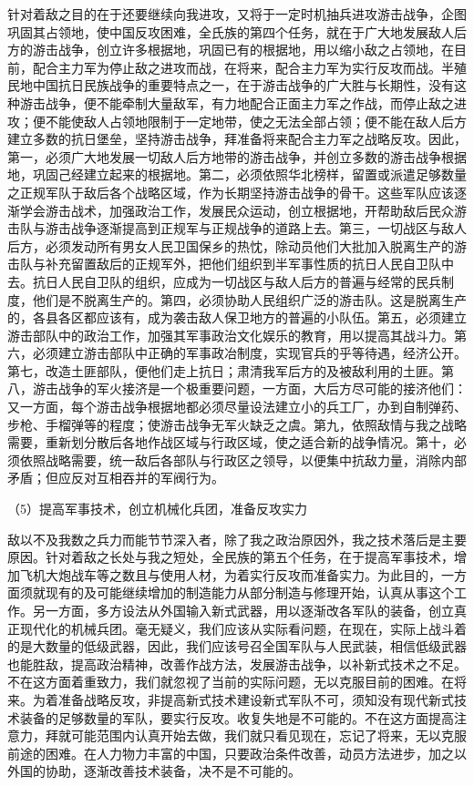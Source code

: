 \documentclass[UTF8, 12pt, a4paper]{ctexrep}
\begin{document}
针对着敌之目的在于还要继续向我进攻，又将于一定时机抽兵进攻游击战争，企图巩固其占领地，使中国反攻困难，全氏族的第四个任务，就在于广大地发展敌人后方的游击战争，创立许多根据地，巩固已有的根据地，用以缩小敌之占领地，在目前，配合主力军为停止敌之进攻而战，在将来，配合主力军为实行反攻而战。半殖民地中国抗日民族战争的重要特点之一，在于游击战争的广大胜与长期性，没有这种游击战争，便不能牵制大量敌军，有力地配合正面主力军之作战，而停止敌之进攻；便不能使敌人占领地限制于一定地带，使之无法全部占领；便不能在敌人后方建立多数的抗日堡垒，坚持游击战争，拜准备将来配合主力军之战略反攻。因此，第一，必须广大地发展一切敌人后方地带的游击战争，并创立多数的游击战争根据地，巩固己经建立起来的根据地。第二，必须依照华北榜样，留置或派遣足够数量之正规军队于敌后各个战略区域，作为长期坚持游击战争的骨干。这些军队应该逐渐学会游击战术，加强政治工作，发展民众运动，创立根据地，开帮助敌后民众游击队与游击战争逐渐提高到正规军与正规战争的道路上去。第三，一切战区与敌人后方，必须发动所有男女人民卫国保乡的热忱，除动员他们大批加入脱离生产的游击队与补充留置敌后的正规军外，把他们组织到半军事性质的抗日人民自卫队中去。抗日人民自卫队的组织，应成为一切战区与敌人后方的普遍与经常的民兵制度，他们是不脱离生产的。第四，必须协助人民组织广泛的游击队。这是脱离生产的，各县各区都应该有，成为袭击敌人保卫地方的普遍的小队伍。第五，必须建立游击部队中的政治工作，加强其军事政治文化娱乐的教育，用以提高其战斗力。第六，必须建立游击部队中正确的军事政冶制度，实现官兵的乎等待遇，经济公开。第七，改造土匪部队，便他们走上抗日；肃清我军后方的及被敌利用的土匪。第八，游击战争的军火接济是一个极重要问题，一方面，大后方尽可能的接济他们：又一方面，每个游击战争根据地都必须尽量设法建立小的兵工厂，办到自制弹药、步枪、手榴弹等的程度；使游击战争无军火缺乏之虞。第九，依照敌情与我之战略需要，重新划分散后各地作战区域与行政区域，使之适合新的战争情况。第十，必须依照战略需要，统一敌后各部队与行政区之领导，以便集中抗敌力量，消除内部矛盾；但应反对互相吞并的军阀行为。

（5）提高军事技术，创立机械化兵团，准备反攻实力

敌以不及我数之兵力而能节节深入者，除了我之政治原因外，我之技术落后是主要原因。针对着敌之长处与我之短处，全民族的第五个任务，在于提高军事技术，增加飞机大炮战车等之数且与使用人材，为着实行反攻而准备实力。为此目的，一方面须就现有的及可能继续增加的制造能力从部分制造与修理开始，认真从事这个工作。另一方面，多方设法从外国输入新式武器，用以逐渐改各军队的装备，创立真正现代化的机械兵团。毫无疑义，我们应该从实际看问题，在现在，实际上战斗着的是大数量的低级武器，因此，我们应该号召全国军队与人民武装，相信低级武器也能胜敌，提高政治精神，改善作战方法，发展游击战争，以补新式技术之不足。不在这方面着重致力，我们就忽视了当前的实际问题，无以克服目前的困难。在将来。为着准备战略反攻，非提高新式技术建设新式军队不可，须知没有现代新式技术装备的足够数量的军队，要实行反攻。收复失地是不可能的。不在这方面提高注意力，拜就可能范围内认真开始去做，我们就只看见现在，忘记了将来，无以克服前途的困难。在人力物力丰富的中国，只要政治条件改善，动员方法进步，加之以外国的协助，逐渐改善技术装备，决不是不可能的。
\end{document}
